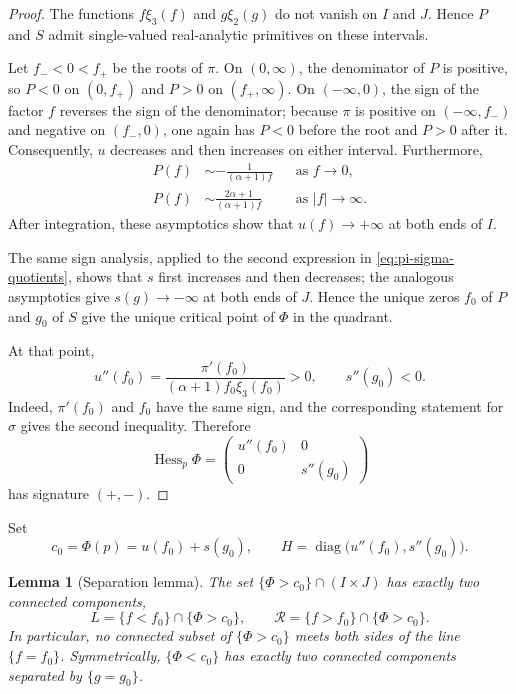 \documentclass[10pt,reqno]{amsart}
\numberwithin{equation}{section}
\theoremstyle{plain}
\newtheorem{lemma}[theorem]{Lemma}
\theoremstyle{remark}
\begin{document}
\begin{proof}
The functions $f\xi_3(f)$ and $g\xi_2(g)$ do not vanish on $I$ and $J$.
Hence $P$ and $S$ admit single-valued real-analytic primitives on these
intervals.

Let $f_-<0<f_+$ be the roots of $\pi$.  On $(0,\infty)$, the denominator
of $P$ is positive, so $P<0$ on $(0,f_+)$ and $P>0$ on $(f_+,\infty)$.
On $(-\infty,0)$, the sign of the factor $f$ reverses the sign of the
denominator; because $\pi$ is positive on $(-\infty,f_-)$ and negative
on $(f_-,0)$, one again has $P<0$ before the root and $P>0$ after it.
Consequently, $u$ decreases and then increases on either interval.
Furthermore,
\begin{align*}
  P(f)&\sim-\frac{1}{(\alpha+1)f}
       &&\text{as }f\to0,\\
  P(f)&\sim\frac{2\alpha+1}{(\alpha+1)f}
       &&\text{as }|f|\to\infty.
\end{align*}
After integration, these asymptotics show that $u(f)\to+\infty$ at both
ends of $I$.

The same sign analysis, applied to the second expression in
\eqref{eq:pi-sigma-quotients}, shows that $s$ first increases and then
decreases; the analogous asymptotics give $s(g)\to-\infty$ at both ends
of $J$.  Hence the unique zeros $f_0$ of $P$ and $g_0$ of $S$ give
the unique critical point of $\Phi$ in the quadrant.

At that point,
\begin{equation}\label{eq:second-derivatives}
  u''(f_0)
  =\frac{\pi'(f_0)}{(\alpha+1)f_0\xi_3(f_0)}>0,
  \qquad
  s''(g_0)<0.
\end{equation}
Indeed, $\pi'(f_0)$ and $f_0$ have the same sign, and the corresponding
statement for $\sigma$ gives the second inequality.  Therefore
\begin{equation}\label{eq:Hessian}
  \operatorname{Hess}_p\Phi
  =\begin{pmatrix}
      u''(f_0)&0\\
      0&s''(g_0)
    \end{pmatrix}
\end{equation}
has signature $(+,-)$.
\end{proof}

Set
\begin{equation}\label{eq:c0H}
  c_0=\Phi(p)=u(f_0)+s(g_0),
  \qquad
  H=\operatorname{diag}\bigl(u''(f_0),s''(g_0)\bigr).
\end{equation}

\begin{lemma}[Separation lemma]\label{lem:separation}
The set $\{\Phi>c_0\}\cap(I\times J)$ has exactly two connected
components,
\begin{equation}\label{eq:LR}
  L=\{f<f_0\}\cap\{\Phi>c_0\},
  \qquad
  \mathcal R=\{f>f_0\}\cap\{\Phi>c_0\}.
\end{equation}
In particular, no connected subset of $\{\Phi>c_0\}$ meets both sides of
the line $\{f=f_0\}$.  Symmetrically, $\{\Phi<c_0\}$ has exactly two
connected components separated by $\{g=g_0\}$.
\end{lemma}
\end{document}
